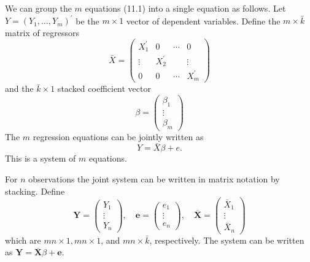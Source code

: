 \documentclass[10pt]{article}
\begin{document}
We can group the $m$ equations (11.1) into a single equation as follows. Let $Y=\left(Y_{1}, \ldots, Y_{m}\right)^{\prime}$ be the $m \times 1$ vector of dependent variables. Define the $m \times \bar{k}$ matrix of regressors
$$
\bar{X}=\left(\begin{array}{cccc}
X_{1}^{\prime} & 0 & \cdots & 0 \\
\vdots & X_{2}^{\prime} & & \vdots \\
0 & 0 & \cdots & X_{m}^{\prime}
\end{array}\right)
$$
and the $\bar{k} \times 1$ stacked coefficient vector
$$
\beta=\left(\begin{array}{c}
\beta_{1} \\
\vdots \\
\beta_{m}
\end{array}\right)
$$
The $m$ regression equations can be jointly written as
$$
Y=\bar{X} \beta+e .
$$
This is a system of $m$ equations.

For $n$ observations the joint system can be written in matrix notation by stacking. Define
$$
\boldsymbol{Y}=\left(\begin{array}{c}
Y_{1} \\
\vdots \\
Y_{n}
\end{array}\right), \quad \boldsymbol{e}=\left(\begin{array}{c}
e_{1} \\
\vdots \\
e_{n}
\end{array}\right), \quad \overline{\boldsymbol{X}}=\left(\begin{array}{c}
\bar{X}_{1} \\
\vdots \\
\bar{X}_{n}
\end{array}\right)
$$
which are $m n \times 1, m n \times 1$, and $m n \times \bar{k}$, respectively. The system can be written as $\boldsymbol{Y}=\overline{\boldsymbol{X}} \beta+\boldsymbol{e}$.
\end{document}
